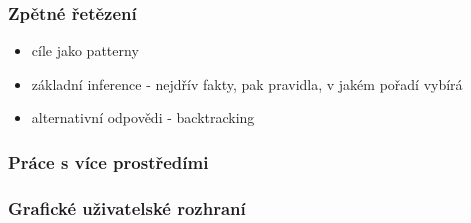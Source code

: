 \subsubsection{Zpětné řetězení}
\begin{framed}
  \begin{itemize}
    \item cíle jako patterny
    \item základní inference - nejdřív fakty, pak pravidla, v jakém pořadí
      vybírá
    \item alternativní odpovědi - backtracking
  \end{itemize}
\end{framed}

\subsubsection{Práce s více prostředími}
\label{multiple environments}

\subsubsection{Grafické uživatelské rozhraní}
